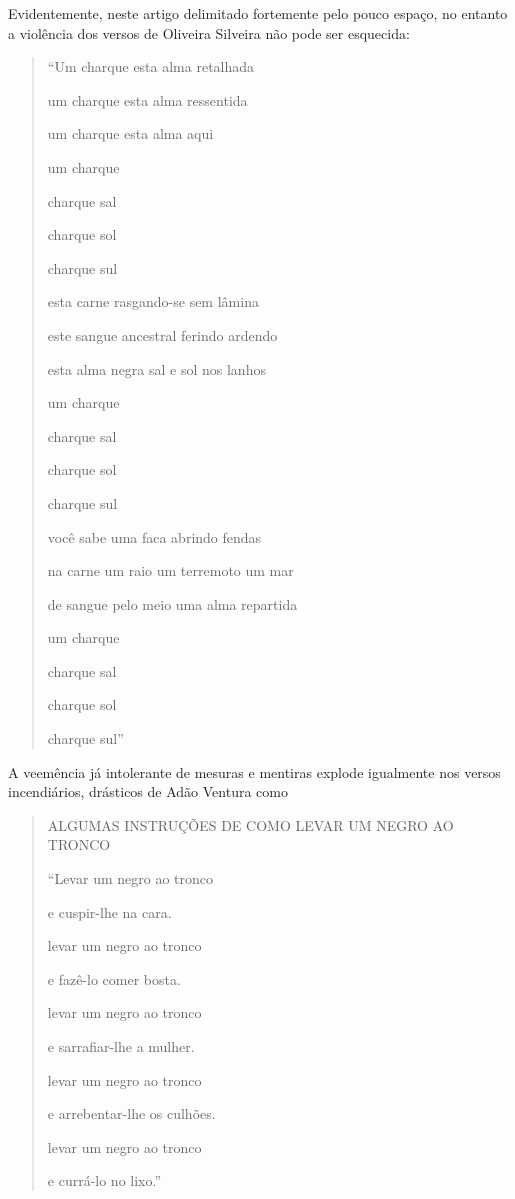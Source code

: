 \documentclass[
  letterpaper,
  DIV=11,
  numbers=noendperiod]{scrreprt}
\begin{document}
Evidentemente, neste artigo delimitado fortemente pelo pouco espaço, no
entanto a violência dos versos de Oliveira Silveira não pode ser
esquecida:

\begin{quote}
``Um charque esta alma retalhada~

um charque esta alma ressentida~

um charque esta alma aqui~

um charque~

charque sal~

charque sol~

charque sul~

esta carne rasgando-se sem lâmina~

este sangue ancestral ferindo ardendo~

esta alma negra sal e sol nos lanhos~

um charque~

charque sal~

charque sol~

charque sul~

você sabe uma faca abrindo fendas~

na carne um raio um terremoto um mar~

de sangue pelo meio uma alma repartida~

um charque~

charque sal~

charque sol~

charque sul''
\end{quote}

A veemência já intolerante de mesuras e mentiras explode igualmente nos
versos incendiários, drásticos de Adão Ventura como

\begin{quote}
ALGUMAS INSTRUÇÕES DE COMO LEVAR UM NEGRO AO TRONCO~

``Levar um negro ao tronco~

e cuspir-lhe na cara.~

levar um negro ao tronco~

e fazê-lo comer bosta.~

levar um negro ao tronco~

e sarrafiar-lhe a mulher.~

levar um negro ao tronco~

e arrebentar-lhe os culhões.~

levar um negro ao tronco~

e currá-lo no lixo.''
\end{quote}
\end{document}
